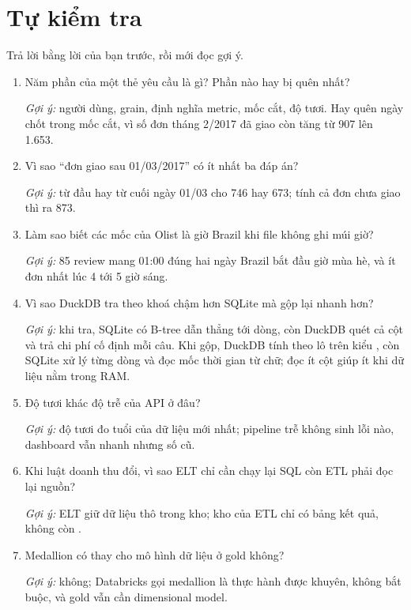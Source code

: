 \section{Tự kiểm tra}

Trả lời bằng lời của bạn trước, rồi mới đọc gợi ý.

\begin{enumerate}
  \item Năm phần của một thẻ yêu cầu là gì? Phần nào hay bị quên nhất?\par
  \textit{Gợi ý:} người dùng, grain, định nghĩa metric, mốc cắt, độ tươi. Hay quên ngày chốt trong mốc cắt, vì số đơn tháng 2/2017 đã giao còn tăng từ 907 lên 1.653.
  \item Vì sao ``đơn giao sau 01/03/2017'' có ít nhất ba đáp án?\par
  \textit{Gợi ý:} từ đầu hay từ cuối ngày 01/03 cho 746 hay 673; tính cả đơn chưa giao thì ra 873.
  \item Làm sao biết các mốc của Olist là giờ Brazil khi file không ghi múi giờ?\par
  \textit{Gợi ý:} 85 review mang 01:00 đúng hai ngày Brazil bắt đầu giờ mùa hè, và ít đơn nhất lúc 4 tới 5 giờ sáng.
  \item Vì sao DuckDB tra theo khoá chậm hơn SQLite mà gộp lại nhanh hơn?\par
  \textit{Gợi ý:} khi tra, SQLite có B-tree dẫn thẳng tới dòng, còn DuckDB quét cả cột  và trả chi phí cố định mỗi câu. Khi gộp, DuckDB tính theo lô trên kiểu , còn SQLite xử lý từng dòng và đọc mốc thời gian từ chữ; đọc ít cột giúp ít khi dữ liệu nằm trong RAM.
  \item Độ tươi khác độ trễ của API ở đâu?\par
  \textit{Gợi ý:} độ tươi đo tuổi của dữ liệu mới nhất; pipeline trễ không sinh lỗi nào, dashboard vẫn nhanh nhưng số cũ.
  \item Khi luật doanh thu đổi, vì sao ELT chỉ cần chạy lại SQL còn ETL phải đọc lại nguồn?\par
  \textit{Gợi ý:} ELT giữ dữ liệu thô trong kho; kho của ETL chỉ có bảng kết quả, không còn .
  \item Medallion có thay cho mô hình dữ liệu ở gold không?\par
  \textit{Gợi ý:} không; Databricks gọi medallion là thực hành được khuyên, không bắt buộc, và gold vẫn cần dimensional model.
\end{enumerate}

